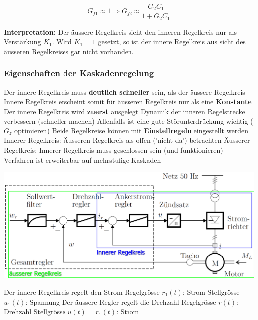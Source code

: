 $$ G_{f1} \approx 1  \Rightarrow G_{f2} \approx \frac{G_2 C_1}{1 + G_2 C_1}  $$

\textbf{Interpretation:} Der äussere Regelkreis sieht den inneren Regelkreis nur als Verstärkung $K_1$. Wird $K_1 = 1$ gesetzt, so
ist der innere Regelkreis aus sicht des äusseren Regelkreises gar nicht vorhanden.


\subsubsection{Eigenschaften der Kaskadenregelung}

\begin{outline}
    \1 Der innere Regelkreis muss \textbf{deutlich schneller} sein, als der äussere Regelkreis
        \2 Innere Regelkreis erscheint somit für äusseren Regelkreis nur als eine \textbf{Konstante}
    \1 Der innere Regelkreis wird \textbf{zuerst} ausgelegt
        \2 Dynamik der inneren Regelstrecke verbessern (schneller machen)
        \2 Allenfalls ist eine gute Störunterdrückung wichtig ($G_z$ optimieren) %
    \1 Beide Regelkreise können mit \textbf{Einstellregeln} eingestellt werden
        \2 Innerer Regelkreis: Äusseren Regelkreis als offen ('nicht da') betrachten
        \2 Äusserer Regelkreis: Innerer Regelkreis muss geschlossen sein (und funktionieren)
    \1 Verfahren ist erweiterbar auf mehrstufige Kaskaden
\end{outline}



\begin{minipage}[c]{0.5\columnwidth}
    \includegraphics[width=\columnwidth]{images/kaskadenregelung_beispiel.png}
\end{minipage}
\hfill
\begin{minipage}[c]{0.48\columnwidth}
    \begin{outline}
        \1 Der innere Regelkreis regelt den Strom
            \2 Regelgrösse $r_1(t)$: Strom
            \2 Stellgrösse $u_1(t)$: Spannung
        \1 Der äussere Regler regelt die Drehzahl
        \2 Regelgrösse $r(t)$: Drehzahl
        \2 Stellgrösse $u(t) = r_1(t)$: Strom
    \end{outline}
\end{minipage}


